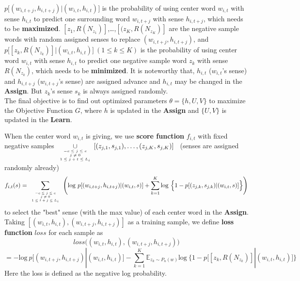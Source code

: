  $p\Big [(w_{i,t+j},h_{i,t+j})|(w_{i,t},h_{i,t})\Big ]$ is the probability of using center word $w_{i,t}$ with sense $h_{i,t}$ to predict one surrounding word $w_{i,t+j}$ with sense $h_{i,t+j}$, which needs to be \textbf{maximized}.
$[z_1,R(N_{z_1})]$,\ldots,$[(z_K,R(N_{z_K})]$ are the negative sample words with random assigned senses to replace $(w_{i,t+j},h_{i,t+j})$, and $p\Big[[z_k,R(N_{z_k})]|(w_{i,t},h_{i,t})\Big ]\ (1\leq k\leq K)$ is the probability of using center word $w_{i,t}$ with sense $h_{i,t}$ to predict one negative sample word $z_k$ with sense $R(N_{z_k})$, which needs to be \textbf{minimized}. 
It is noteworthy that, $h_{i,t}$  ($w_{i,t}$'s sense) and $h_{i,t+j}$ ($w_{i,t+j}$'s sense) are assigned advance and $h_{i,t}$ may be changed in the \textbf{Assign}. But $z_k$'s sense $s_k$ is always assigned randomly. \\

The final objective is to find out optimized parameters $\theta = \{h,U,V\}$ to maximize the Objective Function $G$, where $h$ is updated in the \textbf{Assign} and $\{U,V\}$ is updated in the \textbf{Learn}.

 When the center word $w_{i,t}$ is giving, we use \textbf{score function} $f_{i,t}$ with fixed negative samples $\displaystyle{\mathop{\cup}_{\mbox{\tiny$\begin{array}{c}-c\leq j \leq c\\ j\neq 0\\ 1\leq j+t\leq L_i\end{array}$}}}[(z_{j,1},s_{j,1}),\ldots,(z_{j,K},s_{j,K})]$ \ (senses are assigned randomly already)
$$f_{i,t}(s) = \sum\limits_{\mbox{\tiny$\begin{array}{c}-c\leq j \leq c\\ j\neq 0\\ 1\leq t+j\leq L_i\end{array}$}}\Bigg (\mathrm{log}\ p[(w_{i,t+j},h_{i,t+j})|(w_{i,t},s) ]+\sum\limits_{k=1}^K\mathrm{log}\ \Big \{1-p[(z_{j,k},s_{j,k})|(w_{i,t},s)] \Big \} \Bigg )$$ 
to select the "best" sense (with the max value) of each center word in the \textbf{Assign}. \\

Taking $[ (w_{i,t},h_{i,t}),(w_{i,t+j},h_{i,t+j})]$ as a training sample, we define \textbf{loss function} $loss$ for each sample as
$$loss\big ( (w_{i,t},h_{i,t}),(w_{i,t+j},h_{i,t+j})\big )$$
$$ = -\mathrm{log}\ p\Big [(w_{i,t+j},h_{i,t+j})|(w_{i,t},h_{i,t})\Big ]-\sum\limits_{k=1}^K\mathbb{E}_{z_k\sim P_n(w)}\mathrm{log}\ \Big \{1-p\Big[[z_k,R(N_{z_k})]|(w_{i,t},h_{i,t})\Big ] \Big \}$$
Here the loss is defined as the negative log probability. \\

